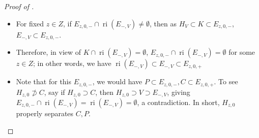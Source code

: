\begin{proof}[Proof of ]
\begin{itemize}
\begin{itemize}
\begin{itemize}
				            \item For fixed $z\in Z$, if $E_{z,0,-}\cap \operatorname{ri}(E_{-,V})\neq\emptyset$, then as $H_V\subset K\subset E_{z,0,-}$, $E_{-,V}\subset E_{z,0,-}$.
				            \item Therefore, in view of $K\cap \operatorname{ri}(E_{-,V})=\emptyset$, $E_{z,0,-}\cap \operatorname{ri}(E_{-,V})=\emptyset$ for some $z\in Z$; in other words, we have $\operatorname{ri}(E_{-,V})\subset E_{-,V}\subset E_{z,0,+}$
				            \item Note that for this $E_{z,0,-}$, we would have $P\subset E_{z,0,-},C\subset E_{z,0,+}$. To see $H_{z,0}\nsupset C$, say if $H_{z,0}\supset C$, then $H_{z,0}\supset V\supset E_{-,V}$, giving $E_{z,0,-}\cap \operatorname{ri}(E_{-,V})=\operatorname{ri}(E_{-,V})=\emptyset$, a contradiction. In short, $H_{z,0}$ properly separates $C,P$.\qedhere{}
			            \end{itemize}
		      \end{itemize}
	\end{itemize}
\end{proof}
